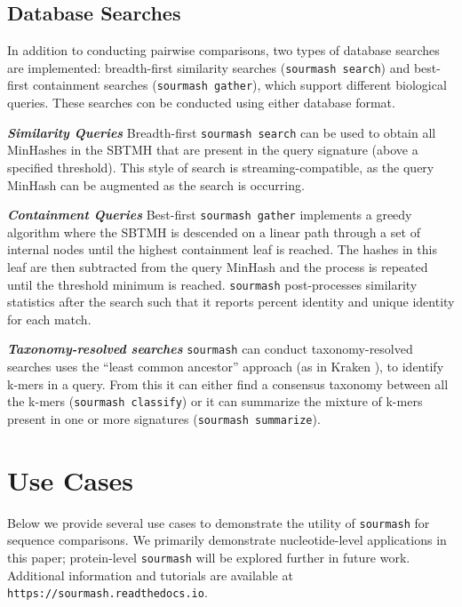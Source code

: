 \documentclass[10pt,a4paper,twocolumn]{article}
\begin{document}
\subsection*{Database Searches}
In addition to conducting pairwise comparisons, two types of database searches are implemented: breadth-first similarity searches (\lstinline{sourmash search}) and best-first containment searches (\lstinline{sourmash gather}), which support different biological queries. These searches con be conducted using either database format. 

\textit{\textbf{Similarity Queries}} Breadth-first \lstinline{sourmash search} can be used to obtain all MinHashes in the SBTMH that are present in the query signature (above a specified threshold). This style of search is streaming-compatible, as the query MinHash can be augmented as the search is occurring.


\textit{\textbf{Containment Queries}}
 Best-first \lstinline{sourmash gather} implements a greedy algorithm where the SBTMH is descended on a linear path through a set of internal nodes until the highest containment leaf is reached. The hashes in this leaf are then subtracted from the query MinHash and the process is repeated until the threshold minimum is reached. \lstinline{sourmash} post-processes similarity statistics after the search such that it reports percent identity and unique identity for each match.

\textit{\textbf{Taxonomy-resolved searches}}
\lstinline{sourmash} can conduct taxonomy-resolved searches uses the “least common ancestor” approach (as in Kraken \cite{wood2014kraken}), to identify k-mers in a query. From this it can either find a consensus taxonomy between all the k-mers (\lstinline{sourmash classify}) or it can summarize the mixture of k-mers present in one or more signatures (\lstinline{sourmash summarize}).



\section*{Use Cases}

Below we provide several use cases to demonstrate the utility of \lstinline{sourmash} for sequence comparisons. We primarily demonstrate nucleotide-level applications in this paper; protein-level \lstinline{sourmash} will be explored further in future work. Additional information and tutorials are available at \lstinline{https://sourmash.readthedocs.io}.
\end{document}
